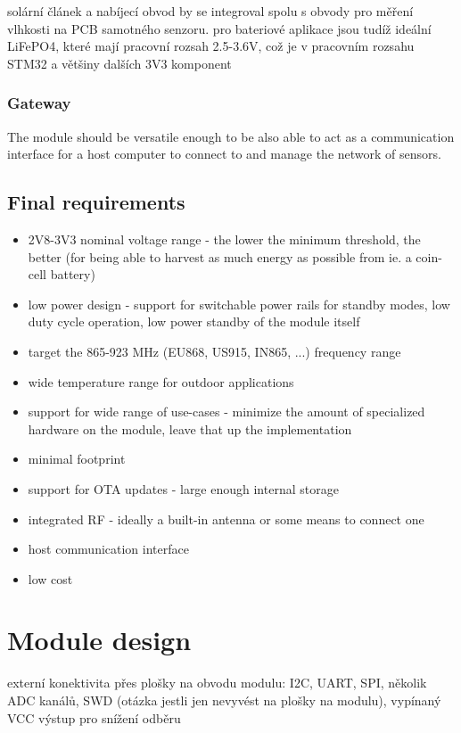 solární článek a nabíjecí obvod by se integroval spolu s obvody pro měření vlhkosti na PCB samotného senzoru. pro bateriové aplikace jsou tudíž ideální LiFePO4, které mají pracovní rozsah 2.5-3.6V, což je v pracovním rozsahu STM32 a většiny dalších 3V3 komponent

\subsubsection{Gateway}
The module should be versatile enough to be also able to act as a communication interface for a host computer to connect to and manage the network of sensors.

\subsection{Final requirements}
\begin{itemize}
    \item 2V8-3V3 nominal voltage range - the lower the minimum threshold, the better (for being able to harvest as much energy as possible from ie. a coin-cell battery)
    \item low power design - support for switchable power rails for standby modes, low duty cycle operation, low power standby of the module itself
    \item target the 865-923 MHz (EU868, US915, IN865, ...) frequency range
    \item wide temperature range for outdoor applications
    \item support for wide range of use-cases - minimize the amount of specialized hardware on the module, leave that up the implementation
    \item minimal footprint
    \item support for OTA updates - large enough internal storage
    \item integrated RF - ideally a built-in antenna or some means to connect one
    \item host communication interface
    \item low cost
\end{itemize}

\section{Module design}
externí konektivita přes plošky na obvodu modulu: I2C, UART, SPI, několik ADC kanálů, SWD (otázka jestli jen nevyvést na plošky na modulu), vypínaný VCC výstup pro snížení odběru

